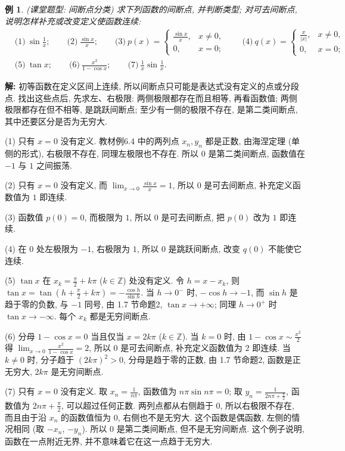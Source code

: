 \documentclass[UTF8,openany]{ctexbook}
\theoremstyle{chinesetextbook}
\newtheorem{example}{例}[section]
\newenvironment{cnsolution}{\par\indent\textbf{解:} \ignorespaces}{\par}
\begin{document}
\begin{example}
\textnormal{(课堂题型: 间断点分类)} 求下列函数的间断点, 并判断类型; 对可去间断点, 说明怎样补充或改变定义使函数连续:
\[
\begin{aligned}
&\text{(1)}\ \sin\frac1x;\qquad\text{(2)}\ \frac{\sin x}x;\qquad\text{(3)}\ p(x)=\begin{cases}\frac{\sin x}x,&x\ne0,\\0,&x=0;\end{cases}\qquad\text{(4)}\ q(x)=\begin{cases}\frac x{|x|},&x\ne0,\\0,&x=0;\end{cases}\\
&\text{(5)}\ \tan x;\qquad\text{(6)}\ \frac{x^2}{1-\cos x};\qquad\text{(7)}\ \frac1x\sin\frac1x.
\end{aligned}
\]
\end{example}
\begin{cnsolution}
初等函数在定义区间上连续, 所以间断点只可能是表达式没有定义的点或分段点. 找出这些点后, 先求左、右极限: 两侧极限都存在而且相等, 再看函数值; 两侧极限都存在但不相等, 是跳跃间断点; 至少有一侧的极限不存在, 是第二类间断点, 其中还要区分是否为无穷大.

(1) 只有 $x=0$ 没有定义. 教材例6.4 中的两列点 $x_n,y_n$ 都是正数, 由海涅定理 (单侧的形式), 右极限不存在, 同理左极限也不存在. 所以 $0$ 是第二类间断点, 函数值在 $-1$ 与 $1$ 之间振荡.

(2) 只有 $x=0$ 没有定义, 而 $\displaystyle\lim_{x\to0}\frac{\sin x}x=1$, 所以 $0$ 是可去间断点, 补充定义函数值为 $1$ 即连续.

(3) 函数值 $p(0)=0$, 而极限为 $1$, 所以 $0$ 是可去间断点, 把 $p(0)$ 改为 $1$ 即连续.

(4) 在 $0$ 处左极限为 $-1$, 右极限为 $1$, 所以 $0$ 是跳跃间断点, 改变 $q(0)$ 不能使它连续.

(5) $\tan x$ 在 $\displaystyle x_k=\frac\pi2+k\pi$ ($k\in\mathbb Z$) 处没有定义. 令 $h=x-x_k$, 则 $\displaystyle\tan x=\tan\left(h+\frac\pi2+k\pi\right)=-\frac{\cos h}{\sin h}$. 当 $h\to0^-$ 时, $-\cos h\to-1$, 而 $\sin h$ 是趋于零的负数, 与 $-1$ 同号, 由 1.7 节命题2, $\tan x\to+\infty$; 同理 $h\to0^+$ 时 $\tan x\to-\infty$. 每个 $x_k$ 都是无穷间断点.

(6) 分母 $1-\cos x=0$ 当且仅当 $x=2k\pi$ ($k\in\mathbb Z$). 当 $k=0$ 时, 由 $\displaystyle1-\cos x\sim\frac{x^2}2$ 得 $\displaystyle\lim_{x\to0}\frac{x^2}{1-\cos x}=2$, 所以 $0$ 是可去间断点, 补充定义函数值为 $2$ 即连续. 当 $k\ne0$ 时, 分子趋于 $(2k\pi)^2>0$, 分母是趋于零的正数, 由 1.7 节命题2, 函数是正无穷大, $2k\pi$ 是无穷间断点.

(7) 只有 $x=0$ 没有定义. 取 $\displaystyle x_n=\frac1{n\pi}$, 函数值为 $n\pi\sin n\pi=0$; 取 $\displaystyle y_n=\frac1{2n\pi+\frac\pi2}$, 函数值为 $\displaystyle2n\pi+\frac\pi2$, 可以超过任何正数. 两列点都从右侧趋于 $0$, 所以右极限不存在, 而且由于沿 $x_n$ 的函数值恒为 $0$, 右侧也不是无穷大. 这个函数是偶函数, 左侧的情况相同 (取 $-x_n$, $-y_n$). 所以 $0$ 是第二类间断点, 但不是无穷间断点. 这个例子说明, 函数在一点附近无界, 并不意味着它在这一点趋于无穷大.
\end{cnsolution}
\end{document}
